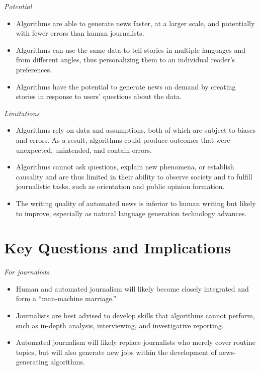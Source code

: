 \documentclass[notoc, symmetric, nobib, nols]{towcenter-guideto-book}
\begin{document}
\textit{Potential}
\begin{itemize}
\item Algorithms are able to generate news faster, at a larger scale, and potentially with fewer errors than human journalists. 
\item Algorithms can use the same data to tell stories in multiple languages and from different angles, thus personalizing them to an individual reader's preferences. 
\item Algorithms have the potential to generate news on demand by creating stories in response to users' questions about the data.
\end{itemize}

\textit{Limitations}
\begin{itemize}
\item Algorithms rely on data and assumptions, both of which are subject to biases and errors. As a result, algorithms could produce outcomes that were unexpected, unintended, and contain errors. 
\item Algorithms cannot ask questions, explain new phenomena, or establish causality and are thus limited in their ability to observe society and to fulfill journalistic tasks, such as orientation and public opinion formation. 
\item The writing quality of automated news is inferior to human writing but likely to improve, especially as natural language generation technology advances.
\end{itemize}

\section{Key Questions and Implications}

\textit{For journalists}
\begin{itemize}
\item Human and automated journalism will likely become closely integrated and form a “man-machine marriage.” 
\item Journalists are best advised to develop skills that algorithms cannot perform, such as in-depth analysis, interviewing, and investigative reporting. 
\item Automated journalism will likely replace journalists who merely cover routine topics, but will also generate new jobs within the development of news-generating algorithms. 
\end{itemize}
\end{document}
